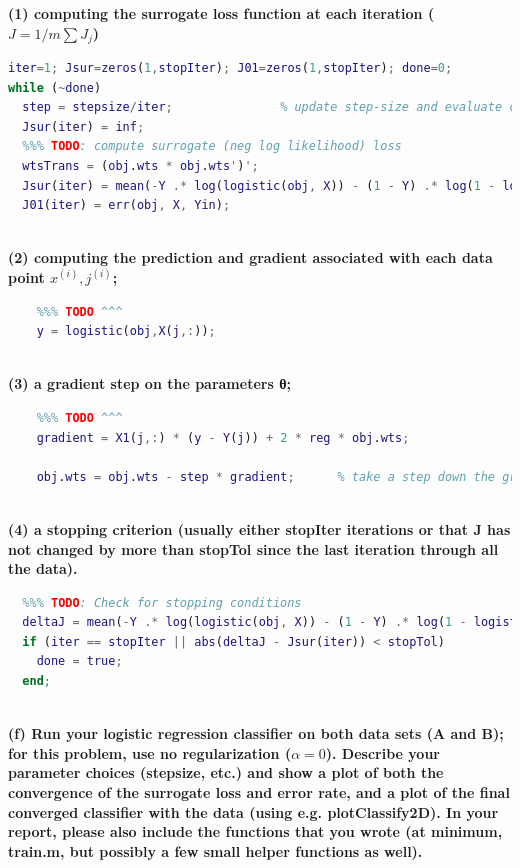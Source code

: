 \documentclass[]{report}   %
\begin{document}
{\bf (1) computing the surrogate loss function at each iteration ($J = 1/m\sum J_{j}$)}
\begin{lstlisting}[language=Matlab, caption=Calculating surrogate loss at each point.]
iter=1; Jsur=zeros(1,stopIter); J01=zeros(1,stopIter); done=0; 
while (~done) 
  step = stepsize/iter;               % update step-size and evaluate current loss values
  Jsur(iter) = inf;   
  %%% TODO: compute surrogate (neg log likelihood) loss
  wtsTrans = (obj.wts * obj.wts')';
  Jsur(iter) = mean(-Y .* log(logistic(obj, X)) - (1 - Y) .* log(1 - logistic(obj, X)) + reg * sum(wtsTrans));
  J01(iter) = err(obj, X, Yin);
\end{lstlisting}
~\\
{\bf (2) computing the prediction and gradient associated with each data point $x^{(i)}, j^{(i)}$;}
\begin{lstlisting}[language=Matlab, caption=Compute linear responses and activation for data point j.]
    % Compute linear responses and activation for data point j
    %%% TODO ^^^
    y = logistic(obj,X(j,:));
\end{lstlisting}
~\\
{\bf (3) a gradient step on the parameters θ;}
\begin{lstlisting}[language=Matlab, caption=Compute gradient.]
    % Compute gradient:
    %%% TODO ^^^
    gradient = X1(j,:) * (y - Y(j)) + 2 * reg * obj.wts;

    obj.wts = obj.wts - step * gradient;      % take a step down the gradient
\end{lstlisting}
~\\
{\bf (4) a stopping criterion (usually either stopIter iterations or that J has not changed by more than stopTol since the last iteration through all the data).}
\begin{lstlisting}[language=Matlab, caption=Implement stopping criterion.]
  %   done = false;
  %%% TODO: Check for stopping conditions
  deltaJ = mean(-Y .* log(logistic(obj, X)) - (1 - Y) .* log(1 - logistic(obj, X)) + reg * obj.wts * obj.wts');  
  if (iter == stopIter || abs(deltaJ - Jsur(iter)) < stopTol)
    done = true;
  end;
\end{lstlisting}
~\\
{\bf (f) Run your logistic regression classifier on both data sets (A and B); for this problem, use no regularization ($\alpha = 0$). Describe your parameter choices (stepsize, etc.) and show a plot of both the convergence of the surrogate loss and error rate, and a plot of the final converged classifier with the data (using e.g. plotClassify2D). In your report, please also include the functions that you wrote (at minimum, train.m, but possibly a few small helper functions as well).}
\end{document}
